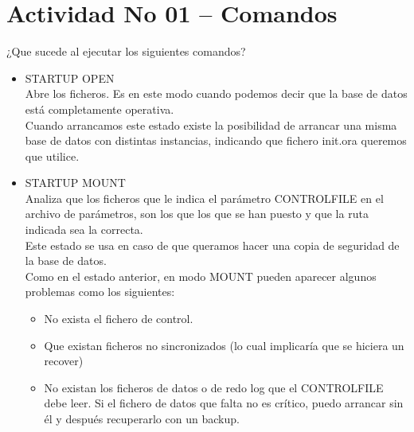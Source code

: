 \section{Actividad No 01 – Comandos} 
¿Que sucede al ejecutar los siguientes comandos? 
\begin{itemize}
\item STARTUP OPEN
	\\Abre los ficheros. Es en este modo cuando podemos decir que la base de datos está
		completamente operativa.
	\\Cuando arrancamos este estado existe la posibilidad de arrancar una misma base de datos
    con distintas instancias, indicando que fichero init.ora queremos que utilice.	
	\item STARTUP MOUNT
	\\Analiza que los ficheros que le indica el parámetro CONTROLFILE en el archivo de
		parámetros, son los que los que se han puesto y que la ruta indicada sea la correcta.
	\\Este estado se usa en caso de que queramos hacer una copia de seguridad de la base de
		datos.
	\\Como en el estado anterior, en modo MOUNT pueden aparecer algunos problemas como los
		siguientes:
		\begin{itemize}
			\item No exista el fichero de control.
			\item Que existan ficheros no sincronizados (lo cual implicaría que se hiciera un 	recover)
			\item No existan los ficheros de datos o de redo log que el CONTROLFILE debe leer. 
			Si el fichero de datos que falta no es crítico, puedo arrancar sin él y después recuperarlo 
			con un backup.
			

\end{itemize}
\end{itemize}
